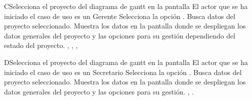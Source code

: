 	\begin{UCtrayectoriaA}{C}{Selecciona el proyecto del diagrama de gantt en la pantalla }{El actor que se ha iniciado el caso de uso es un Gerente}
	 	\UCpaso[\UCactor] Selecciona la opción .
		\UCpaso Busca datos del proyecto seleccionado.
 		\UCpaso Muestra los datos en la pantalla  donde se despliegan los datos generales del proyecto y las opciones para su gestión dependiendo del estado del proyecto. , , , 
	\end{UCtrayectoriaA}

	\begin{UCtrayectoriaA}{D}{Selecciona el proyecto del diagrama de gantt en la pantalla }{El actor que se ha iniciado el caso de uso es un Secretario}
	 	\UCpaso[\UCactor] Selecciona la opción .
		\UCpaso Busca datos del proyecto seleccionado.
 		\UCpaso Muestra los datos en la pantalla  donde se despliegan los datos generales del proyecto y las opciones para su gestión. , .
	\end{UCtrayectoriaA}



	
